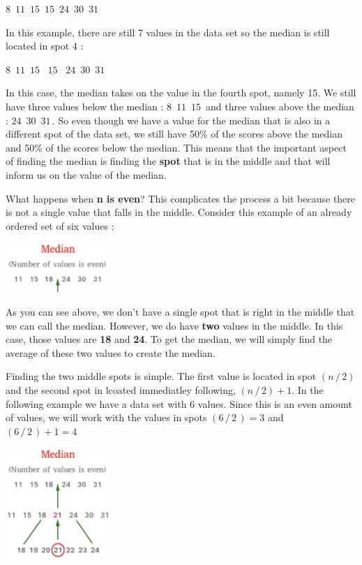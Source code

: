 \documentclass[
  letterpaper,
  DIV=11,
  numbers=noendperiod]{scrreprt}
\begin{document}
\(8\,\,\, 11\,\,\,  15\,\,\,  15\,\,\,  24\,\,\,  30\,\,\,  31\)

In this example, there are still 7 values in the data set so the median
is still located in spot 4 :

\(8\,\,\, 11\,\,\,  15\,\,\,  \underline{\,\,15\,\,}\,\,\,  24\,\,\,  30\,\,\,  31\)

In this case, the median takes on the value in the fourth spot, namely
15. We still have three values below the median :
\(8\,\,\, 11 \,\,\, 15\,\) and three values above the median :
\(24 \,\,\, 30\,\,\, 31\,\). So even though we have a value for the
median that is also in a different spot of the data set, we still have
50\% of the scores above the median and 50\% of the scores below the
median. This means that the important aspect of finding the median is
finding the \textbf{spot} that is in the middle and that will inform us
on the value of the median.

What happens when \textbf{n is even}? This complicates the process a bit
because there is not a single value that falls in the middle. Consider
this example of an already ordered set of six values :

\includegraphics[width=0.3\textwidth,height=\textheight]{./images/Daily-4-Pic-6.jpg}

As you can see above, we don't have a single spot that is right in the
middle that we can call the median. However, we do have \textbf{two}
values in the middle. In this case, those values are \textbf{18} and
\textbf{24}. To get the median, we will simply find the average of these
two values to create the median.

Finding the two middle spots is simple. The first value is located in
spot \((n\,/\,2)\) and the second spot in lcoated immediatley following,
\((n\,/\,2) + 1\). In the following example we have a data set with
\(6\) values. Since this is an even amount of values, we will work with
the values in spots \((6\,/\,2\,) = 3\) and \((6\,/\,2\,) + 1 = 4\)

\includegraphics[width=0.3\textwidth,height=\textheight]{./images/Daily-4-Pic-7.jpg}
\end{document}
